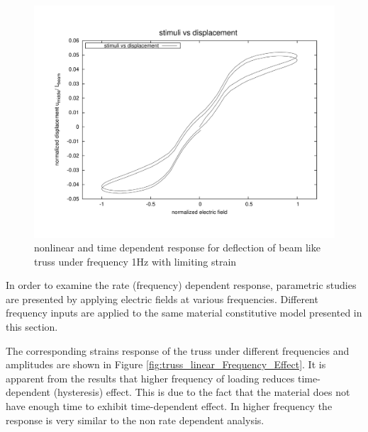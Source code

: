 \begin{figure}  
\centering
\includegraphics[width=5.0in]{./chap_5_active_trusses/images_non_linear_time_dependent_constitutive_equatio/limiting_strain_linear_tetrahedral_time_dependent_efield_vs_displacement_nonlinear.pdf}
\caption{nonlinear and time dependent response for deflection of beam like truss under frequency 1Hz with limiting strain}
\label{fig:limiting_strain_linear_tetrahedral_time_dependent_efield_vs_displacement_nonlinear}
\end{figure} 

In order to examine the rate (frequency) dependent response, parametric studies are presented by applying electric fields at various frequencies. 
Different frequency inputs are applied to the same material constitutive model presented in this section. 

The corresponding strains response of the truss under different frequencies and amplitudes are shown in Figure \ref{fig:truss_linear_Frequency_Effect}. 
It is apparent from the results that higher frequency of loading reduces time-dependent (hysteresis) effect. 
This is due to the fact that the material does not have enough time to exhibit time-dependent effect. 
In higher frequency the response is very similar to the non rate dependent analysis. 

